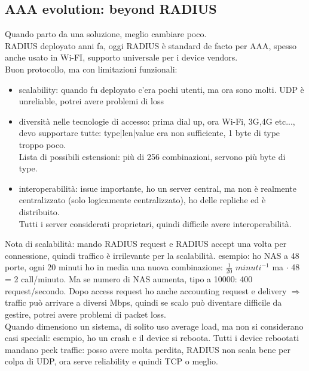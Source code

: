 \documentclass[16px]{article}
\begin{document}
\subsection{AAA evolution: beyond RADIUS}
Quando parto da una soluzione, meglio cambiare poco.\\ RADIUS deployato anni fa, oggi RADIUS è standard de facto per AAA, spesso anche usato in Wi-FI, supporto universale per i device vendors.\\ Buon protocollo, ma con limitazioni funzionali:
\begin{itemize}
\item scalability: quando fu deployato c'era pochi utenti, ma ora sono molti. UDP è unreliable, potrei avere problemi di loss
\item diversità nelle tecnologie di accesso: prima dial up, ora Wi-Fi, 3G,4G etc..., devo supportare tutte: type|len|value era non sufficiente, 1 byte di type troppo poco.\\ Lista di possibili estensioni: più di 256 combinazioni, servono più byte di type.
\item interoperabilità: issue importante, ho un server central, ma non è realmente centralizzato (solo logicamente centralizzato), ho delle repliche ed è distribuito.\\ Tutti i server considerati proprietari, quindi difficile avere interoperabilità.
\end{itemize}
Nota di scalabilità: mando RADIUS request e RADIUS accept una volta per connessione, quindi traffico è irrilevante per la scalabilità. esempio: ho NAS a 48 porte, ogni 20 minuti ho in media una nuova combinazione: $\frac{1}{20}$ $minuti^{-1}$ ma $\cdot$ 48 = 2 call/minuto. Ma se numero di NAS aumenta, tipo a 10000: 400 request/secondo. Dopo access request ho anche accounting request e delivery $\Rightarrow$ traffic può arrivare a diversi Mbps, quindi se scalo può diventare difficile da gestire, potrei avere problemi di packet loss.\\ Quando dimensiono un sistema, di solito uso average load, ma non si considerano casi speciali: esempio, ho un crash e il device si reboota. Tutti i device rebootati mandano peek traffic: posso avere molta perdita, RADIUS non scala bene per colpa di UDP, ora serve reliability e quindi TCP o meglio.
\end{document}
